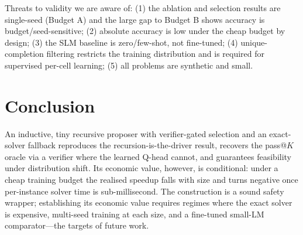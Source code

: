 \documentclass{article}
\begin{document}
Threats to validity we are aware of: (1) the ablation and selection results are
single-seed (Budget A) and the large gap to Budget B shows accuracy is
budget/seed-sensitive; (2) absolute accuracy is low under the cheap budget by
design; (3) the SLM baseline is zero/few-shot, not fine-tuned; (4) unique-
completion filtering restricts the training distribution and is required for
supervised per-cell learning; (5) all problems are synthetic and small.

\section{Conclusion}

An inductive, tiny recursive proposer with verifier-gated selection and an exact-
solver fallback reproduces the recursion-is-the-driver result, recovers the
pass@$K$ oracle via a verifier where the learned Q-head cannot, and guarantees
feasibility under distribution shift. Its economic value, however, is conditional:
under a cheap training budget the realised speedup falls with size and turns
negative once per-instance solver time is sub-millisecond. The construction is a
sound safety wrapper; establishing its economic value requires regimes where the
exact solver is expensive, multi-seed training at each size, and a fine-tuned
small-LM comparator---the targets of future work.
\end{document}
